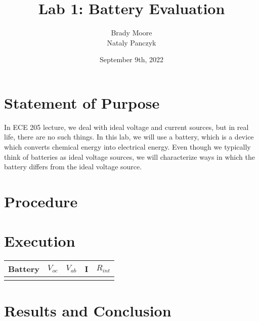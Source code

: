 \documentclass{report}
\title{Lab 1: Battery Evaluation}
\date{September 9th, 2022}
\author{Brady Moore \\
    Nataly Panczyk}
\begin{document}
\maketitle
\section{Statement of Purpose}
In ECE 205 lecture, we deal with ideal voltage and current sources, but in real life, there are no such things.
In this lab, we will use a battery, which is a device which converts chemical energy into electrical energy.
Even though we typically think of batteries as ideal voltage sources, we will characterize ways in which the battery differs from the ideal voltage source.

\section{Procedure}
\section{Execution}
    \begin{tabular}{|c c c c c|}
        \hline
        Battery & $V_{oc}$ & $V_{ab}$ & I & $R_{int}$\\
        \hline
                &       &       &       &
        \hline
    \end{tabular}
\section{Results and Conclusion}
\end{document}
